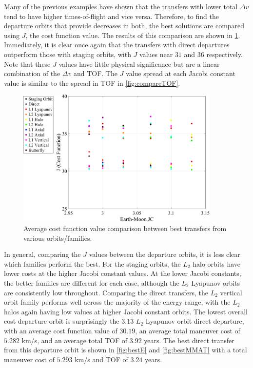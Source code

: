 Many of the previous examples have shown that the transfers with lower total $\Delta v$ tend to
have higher times-of-flight and vice versa. Therefore, to find the departure orbits that provide
decreases in both, the best solutions are compared using $J$, the cost function value. The results
of this comparison are shown in \cref{fig:compareJ}. Immediately, it is clear once again that the
transfers with direct departures outperform those with staging orbits, with $J$ values near $31$
and $36$ respectively. Note that these $J$ values have little physical significance but are a
linear combination of the $\Delta v$ and TOF. The $J$ value spread at each Jacobi constant value is
similar to the spread in TOF in \cref{fig:compareTOF}.

\begin{figure}[!htb]
    \centering
    \includegraphics[width=0.9\textwidth]{figures/JComparison.pdf}
    \caption{Average cost function value comparison between best transfers from various orbits/families.}
    \label{fig:compareJ}
\end{figure}

In general, comparing the $J$ values between the departure orbits, it is less clear which families
perform the best. For the staging orbits, the $L_{2}$ halo orbits have lower costs at the higher
Jacobi constant values. At the lower Jacobi constants, the better families are different for each
case, although the $L_{2}$ Lyapunov orbits are consistently low throughout. Comparing the direct
transfers, the $L_{2}$ vertical orbit family performs well across the majority of the energy range,
with the $L_{2}$ halos again having low values at higher Jacobi constant orbits. The lowest overall
cost departure orbit is surprisingly the $3.13$ $L_{2}$ Lyapunov orbit direct departure, with an
average cost function value of $30.19$, an average total maneuver cost of $5.282$ km/s, and an
average total TOF of $3.92$ years. The best direct transfer from this departure orbit is shown
in \cref{fig:bestE} and \cref{fig:bestMMAT} with a total maneuver cost of $5.293$ km/s and TOF of
$3.24$ years.

